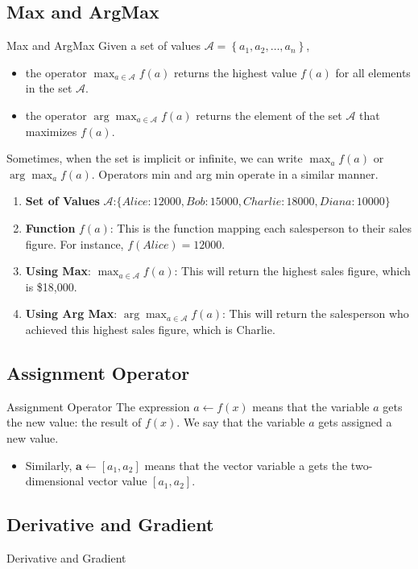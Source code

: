 \documentclass[9pt,dvipsnames]{beamer}
\begin{document}
\subsection{Max and ArgMax}

\begin{frame}{Max and ArgMax}
	Given a set of values $\mathcal{A}=\left\{a_{1}, a_{2}, \ldots, a_{n}\right\}$,

	\begin{itemize}
		\item the operator $\max _{a \in \mathcal{A}} f(a)$ returns the highest value $f(a)$ for all elements in the set $\mathcal{A}$.
		\item the operator $\arg \max _{a \in \mathcal{A}} f(a)$ returns the element of the set $\mathcal{A}$ that maximizes $f(a)$.
	\end{itemize}
	Sometimes, when the set is implicit or infinite, we can write $\max _{a} f(a)$ or $\arg \max _{a} f(a)$. Operators min and arg min operate in a similar manner.

	\begin{tcolorbox}[enhanced jigsaw, breakable, pad at break*=1mm, colback=gray!20!white, colframe=black!85!black, title=\textbf{Example}]
		\begin{enumerate}
			\item \textbf{Set of Values} $\mathcal{A}$:$ \{ Alice: 12000, Bob: 15000, Charlie: 18000, Diana: 10000 \}$
			\item \textbf{Function} $f(a)$: This is the function mapping each salesperson to their sales figure. For instance, $f(Alice) = 12000$.
			\item \textbf{Using Max}: $\max_{a \in \mathcal{A}} f(a)$: This will return the highest sales figure, which is \$18,000.
			\item \textbf{Using Arg Max}: $\arg \max_{a \in \mathcal{A}} f(a)$: This will return the salesperson who achieved this highest sales figure, which is Charlie.
		\end{enumerate}
	\end{tcolorbox}
\end{frame}

\subsection{Assignment Operator}
\begin{frame}{Assignment Operator}
	The expression $a \leftarrow f(x)$ means that the variable $a$ gets the new value: the result of $f(x)$. We say that the variable $a$ gets assigned a new value.
	\begin{itemize}
		\item Similarly, $\mathbf{a} \leftarrow\left[a_{1}, a_{2}\right]$ means that the vector variable a gets the two-dimensional vector value $\left[a_{1}, a_{2}\right]$.
	\end{itemize}
\end{frame}

\subsection{Derivative and Gradient}
\begin{frame}{Derivative and Gradient}
\end{frame}
\end{document}

